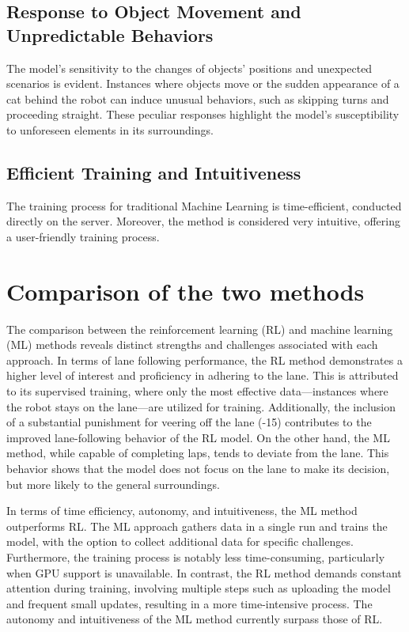 \documentclass[12pt]{report}
\begin{document}
\subsection{Response to Object Movement and Unpredictable Behaviors}

The model's sensitivity to the changes of objects' positions and unexpected scenarios is evident. Instances where objects move or the sudden appearance of a cat behind the robot can induce unusual behaviors, such as skipping turns and proceeding straight. These peculiar responses highlight the model's susceptibility to unforeseen elements in its surroundings.

\subsection{Efficient Training and Intuitiveness}
The training process for traditional Machine Learning is time-efficient, conducted directly on the server. Moreover, the method is considered very intuitive, offering a user-friendly training process.

\section{Comparison of the two methods}
\label{sub:compare}
The comparison between the reinforcement learning (RL) and machine learning (ML) methods reveals distinct strengths and challenges associated with each approach. In terms of lane following performance, the RL method demonstrates a higher level of interest and proficiency in adhering to the lane. This is attributed to its supervised training, where only the most effective data—instances where the robot stays on the lane—are utilized for training. Additionally, the inclusion of a substantial punishment for veering off the lane (-15) contributes to the improved lane-following behavior of the RL model. On the other hand, the ML method, while capable of completing laps, tends to deviate from the lane. This behavior shows that the model does not focus on the lane to make its decision, but more likely to the general surroundings. 

In terms of time efficiency, autonomy, and intuitiveness, the ML method outperforms RL. The ML approach gathers data in a single run and trains the model, with the option to collect additional data for specific challenges. Furthermore, the training process is notably less time-consuming, particularly when GPU support is unavailable. In contrast, the RL method demands constant attention during training, involving multiple steps such as uploading the model and frequent small updates, resulting in a more time-intensive process. The autonomy and intuitiveness of the ML method currently surpass those of RL.
\end{document}
